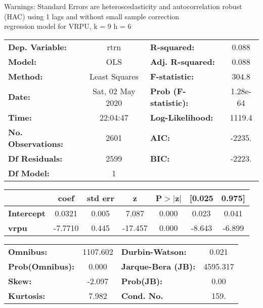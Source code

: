 Warnings: \newline
 [1] Standard Errors are heteroscedasticity and autocorrelation robust (HAC) using 1 lags and without small sample correction\\ 

regression model for VRPU, k = 9 h = 6\begin{center}
\begin{tabular}{lclc}
\toprule
\textbf{Dep. Variable:}    &       rtrn       & \textbf{  R-squared:         } &     0.088   \\
\textbf{Model:}            &       OLS        & \textbf{  Adj. R-squared:    } &     0.088   \\
\textbf{Method:}           &  Least Squares   & \textbf{  F-statistic:       } &     304.8   \\
\textbf{Date:}             & Sat, 02 May 2020 & \textbf{  Prob (F-statistic):} &  1.28e-64   \\
\textbf{Time:}             &     22:04:47     & \textbf{  Log-Likelihood:    } &    1119.4   \\
\textbf{No. Observations:} &        2601      & \textbf{  AIC:               } &    -2235.   \\
\textbf{Df Residuals:}     &        2599      & \textbf{  BIC:               } &    -2223.   \\
\textbf{Df Model:}         &           1      & \textbf{                     } &             \\
\bottomrule
\end{tabular}
\begin{tabular}{lcccccc}
                   & \textbf{coef} & \textbf{std err} & \textbf{z} & \textbf{P$> |$z$|$} & \textbf{[0.025} & \textbf{0.975]}  \\
\midrule
\textbf{Intercept} &       0.0321  &        0.005     &     7.087  &         0.000        &        0.023    &        0.041     \\
\textbf{vrpu}      &      -7.7710  &        0.445     &   -17.457  &         0.000        &       -8.643    &       -6.899     \\
\bottomrule
\end{tabular}
\begin{tabular}{lclc}
\textbf{Omnibus:}       & 1107.602 & \textbf{  Durbin-Watson:     } &    0.021  \\
\textbf{Prob(Omnibus):} &   0.000  & \textbf{  Jarque-Bera (JB):  } & 4595.317  \\
\textbf{Skew:}          &  -2.097  & \textbf{  Prob(JB):          } &     0.00  \\
\textbf{Kurtosis:}      &   7.982  & \textbf{  Cond. No.          } &     159.  \\
\bottomrule
\end{tabular}
\end{center}

